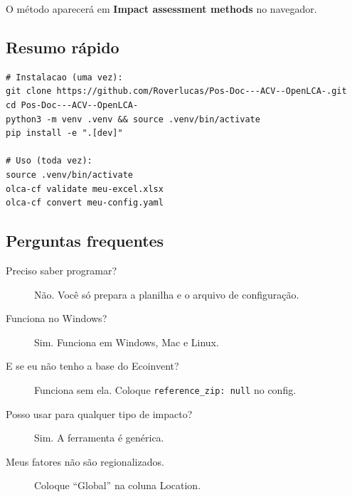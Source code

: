O m\'etodo aparecer\'a em \textbf{Impact assessment methods} no navegador.

\subsection{Resumo r\'apido}

\begin{lstlisting}[style=bash]
# Instalacao (uma vez):
git clone https://github.com/Roverlucas/Pos-Doc---ACV--OpenLCA-.git
cd Pos-Doc---ACV--OpenLCA-
python3 -m venv .venv && source .venv/bin/activate
pip install -e ".[dev]"

# Uso (toda vez):
source .venv/bin/activate
olca-cf validate meu-excel.xlsx
olca-cf convert meu-config.yaml
\end{lstlisting}

\subsection{Perguntas frequentes}

\begin{description}
    \item[Preciso saber programar?] N\~ao. Voc\^e s\'o prepara a planilha e o arquivo de configura\c{c}\~ao.
    \item[Funciona no Windows?] Sim. Funciona em Windows, Mac e Linux.
    \item[E se eu n\~ao tenho a base do Ecoinvent?] Funciona sem ela. Coloque \texttt{reference\_zip: null} no config.
    \item[Posso usar para qualquer tipo de impacto?] Sim. A ferramenta \'e gen\'erica.
    \item[Meus fatores n\~ao s\~ao regionalizados.] Coloque ``Global'' na coluna Location.
\end{description}
